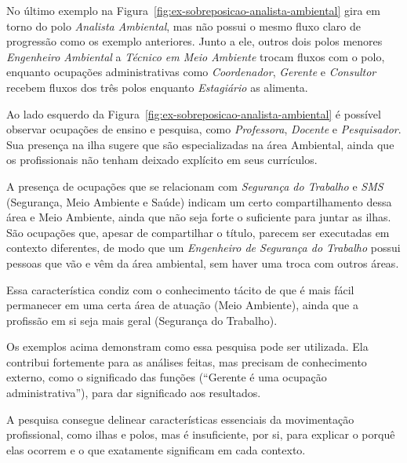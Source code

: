\documentclass[
  article,
  11pt,
  a4paper,
  english,
  brazil,
  sumario=tradicional]{abntex2}
\begin{document}
No último exemplo na Figura~\ref{fig:ex-sobreposicao-analista-ambiental} gira em torno do polo \textit{Analista Ambiental}, mas não possui o mesmo fluxo claro de progressão como os exemplo anteriores. Junto a ele, outros dois polos menores \textit{Engenheiro Ambiental} a \textit{Técnico em Meio Ambiente} trocam fluxos com o polo, enquanto ocupações administrativas como \textit{Coordenador}, \textit{Gerente} e \textit{Consultor} recebem fluxos dos três polos enquanto \textit{Estagiário} as alimenta.

Ao lado esquerdo da Figura~\ref{fig:ex-sobreposicao-analista-ambiental} é possível observar ocupações de ensino e pesquisa, como \textit{Professora}, \textit{Docente} e \textit{Pesquisador}. Sua presença na ilha sugere que são especializadas na área Ambiental, ainda que os profissionais não tenham deixado explícito em seus currículos.

A presença de ocupações que se relacionam com \textit{Segurança do Trabalho} e \textit{SMS} (Segurança, Meio Ambiente e Saúde) indicam um certo compartilhamento dessa área e Meio Ambiente, ainda que não seja forte o suficiente para juntar as ilhas. São ocupações que, apesar de compartilhar o título, parecem ser executadas em contexto diferentes, de modo que um \textit{Engenheiro de Segurança do Trabalho} possui pessoas que vão e vêm da área ambiental, sem haver uma troca com outros áreas.

Essa característica condiz com o conhecimento tácito de que é mais fácil permanecer em uma certa área de atuação (Meio Ambiente), ainda que a profissão em si seja mais geral (Segurança do Trabalho).

Os exemplos acima demonstram como essa pesquisa pode ser utilizada. Ela contribui fortemente para as análises feitas, mas precisam de conhecimento externo, como o significado das funções (\enquote{Gerente é uma ocupação administrativa}), para dar significado aos resultados.

A pesquisa consegue delinear características essenciais da movimentação profissional, como ilhas e polos, mas é insuficiente, por si, para explicar o porquê elas ocorrem e o que exatamente significam em cada contexto.
\end{document}

